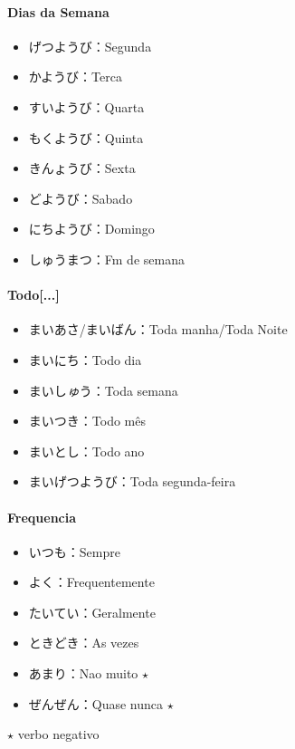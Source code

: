\documentclass[a4paper, 12pt]{article}
\begin{document}
\paragraph{Dias da Semana}
		\begin{CJK}{UTF8}{min}
			\begin{itemize}
				\item げつようび：Segunda
				\item かようび：Terca
				\item すいようび：Quarta
				\item もくようび：Quinta
				\item きんょうび：Sexta
				\item どようび：Sabado
				\item にちようび：Domingo
				\item しゅうまつ：Fm de semana
				
			\end{itemize}
		\end{CJK}

\paragraph{Todo[...]}
	\begin{CJK}{UTF8}{min}
		\begin{itemize}
			\item まいあさ/まいばん：Toda manha/Toda Noite
			\item まいにち：Todo dia
			\item まいし\textit{ゅ}う：Toda semana
			\item まいつき：Todo mês
			\item まいとし：Todo ano
			\item まいげつようび：Toda segunda-feira
		\end{itemize}
	\end{CJK}

\paragraph{Frequencia}
	\begin{CJK}{UTF8}{min}
		\begin{itemize}
			\item いつも：Sempre
			\item よく：Frequentemente
			\item たいてい：Geralmente
			\item ときどき：As vezes
			\item あまり：Nao muito $ \star $
			\item ぜんぜん：Quase nunca $ \star $
		\end{itemize}
	$ \star $ verbo negativo
	\end{CJK}
\end{document}
